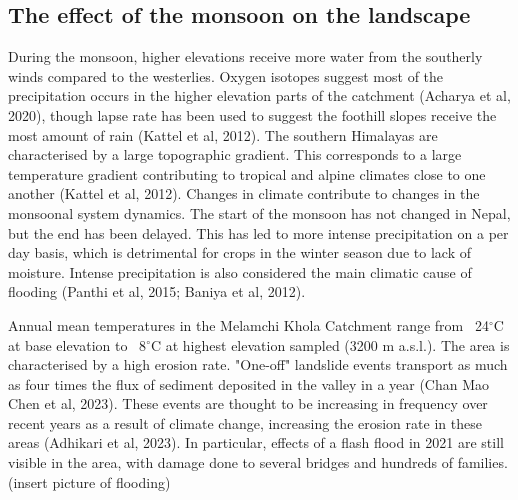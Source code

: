 \bsk

\subsection{The effect of the monsoon on the landscape}
During the monsoon, higher elevations receive more water from the southerly winds compared to the westerlies. Oxygen isotopes suggest most of the precipitation occurs in the higher elevation parts of the catchment (Acharya et al, 2020), though lapse rate has been used to suggest the foothill slopes receive the most amount of rain (Kattel et al, 2012). The southern Himalayas are characterised by a large topographic gradient. This corresponds to a large temperature gradient contributing to tropical and alpine climates close to one another (Kattel et al, 2012). Changes in climate contribute to changes in the monsoonal system dynamics. The start of the monsoon has not changed in Nepal, but the end has been delayed. This has led to more intense precipitation on a per day basis, which is detrimental for crops in the winter season due to lack of moisture. Intense precipitation is also considered the main climatic cause of flooding (Panthi et al, 2015; Baniya et al, 2012). 


Annual mean temperatures in the Melamchi Khola Catchment range from ~24$^{\circ}$C at base elevation to ~8$^{\circ}$C at highest elevation sampled (3200 m a.s.l.). The area is characterised by a high erosion rate. "One-off" landslide events transport as much as four times the flux of sediment deposited in the valley in a year (Chan Mao Chen et al, 2023). These events are thought to be increasing in frequency over recent years as a result of climate change, increasing the erosion rate in these areas (Adhikari et al, 2023). In particular, effects of a flash flood in 2021 are still visible in the area, with damage done to several bridges and hundreds of families. (insert picture of flooding)









